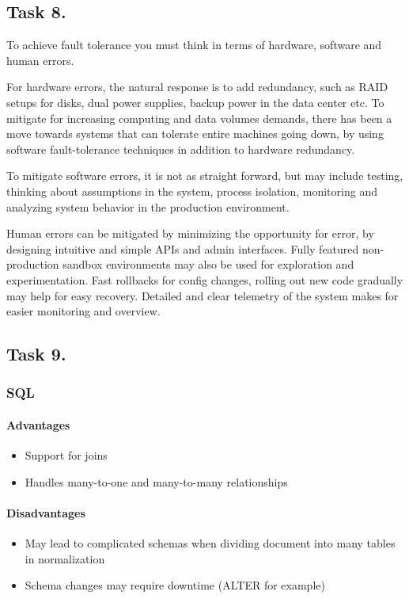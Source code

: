 \documentclass[12pt, titlepage]{report}
\begin{document}
\subsection*{Task 8.}
To achieve fault tolerance you must think in terms of hardware, software and human errors. 

For hardware errors, the natural response is to add redundancy, such as RAID setups for disks, dual power supplies, backup power in the data center etc. To mitigate for increasing computing and data volumes demands, there has been a move towards systems that can tolerate entire machines going down, by using software fault-tolerance techniques in addition to hardware redundancy. 

To mitigate software errors, it is not as straight forward, but may include testing, thinking about assumptions in the system, process isolation, monitoring and analyzing system behavior in the production environment. 

Human errors can be mitigated by minimizing the opportunity for error, by designing intuitive and simple APIs and admin interfaces. Fully featured non-production sandbox environments may also be used for exploration and experimentation. Fast rollbacks for config changes, rolling out new code gradually may help for easy recovery. Detailed and clear telemetry of the system makes for easier monitoring and overview. 
\subsection*{Task 9.}
\subsubsection{SQL}
\paragraph{Advantages}
\begin{itemize}
    \item Support for joins
    \item Handles many-to-one and many-to-many relationships
\end{itemize}
\paragraph{Disadvantages}
\begin{itemize}
    \item May lead to complicated schemas when dividing document into many tables in normalization
    \item Schema changes may require downtime (ALTER for example)
\end{itemize}
\end{document}
